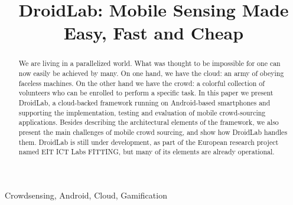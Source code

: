 \documentclass[conference,letterpaper]{IEEEtran}
\begin{document}

\title{DroidLab: Mobile Sensing Made Easy, Fast and Cheap}
\author{
  }




\maketitle


\begin{abstract}
We are living in a parallelized world. What was thought to be impossible for one can now easily be achieved by many. On one hand, we have the cloud: an army of obeying faceless machines. On the other hand we have the crowd: a colorful collection of volunteers who can be enrolled to perform a specific task. In this paper we present DroidLab, a cloud-backed framework running on Android-based smartphones and supporting the implementation, testing and evaluation of mobile crowd-sourcing applications. Besides describing the architectural elements of the framework, we also present the main challenges of mobile crowd sourcing, and show how DroidLab handles them. DroidLab is still under development, as part of the European research project named EIT ICT Labs FITTING, but many of its elements are already operational. 
\end{abstract}

\begin{IEEEkeywords}
Crowdsensing, Android, Cloud, Gamification
\end{IEEEkeywords}
\end{document}
